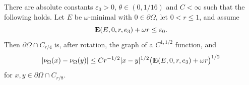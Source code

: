 \begin{theorem}\label{thm:eps-regularity}
There are absolute constants $\varepsilon_0>0$, $\theta\in(0,1/16)$ and
$C<\infty$ such that the following holds.  Let $E$ be $\omega$-minimal with
$0\in\partial\Omega$, let $0<r\le1$, and assume
\begin{equation}\label{eq:eps-reg-hyp-final}
  \operatorname{\mathbf E}(E,0,r,e_3)+\omega r\le\varepsilon_0 .
\end{equation}
Then $\partial\Omega\cap C_{r/4}$ is, after rotation, the graph of a
$C^{1,1/2}$ function, and
\begin{equation}\label{eq:eps-reg-holder}
  |\nu_\Omega(x)-\nu_\Omega(y)|
  \le Cr^{-1/2}|x-y|^{1/2}
    \bigl(\operatorname{\mathbf E}(E,0,r,e_3)+\omega r\bigr)^{1/2}
\end{equation}
for $x,y\in\partial\Omega\cap C_{r/8}$.
\end{theorem}

